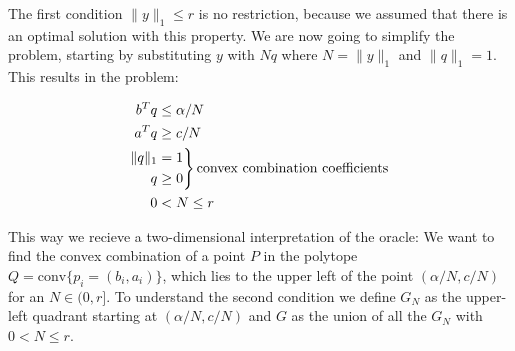 \documentclass[11pt,a4paper]{scrartcl}
\begin{document}
The first condition $\|y\|_1\leq r$ is no restriction, because we assumed that there is an optimal solution with this property. We are now going to simplify the problem, starting by substituting $y$ with $Nq$ where $N=\|y\|_1$ and $\|q\|_1=1$. This results in the problem:

\begin{equation*}
 \begin{split}
  b^T q&\leq \alpha/N\\
  a^T q&\geq c/N\\
  \begin{aligned}
   \|q\|_1\\
   q
  \end{aligned}
  &
  \begin{rcases*}
   =1\\
   \geq 0
  \end{rcases*} \text{convex combination coefficients}  \\
  0&<N\leq r
 \end{split}
\end{equation*}

This way we recieve a two-dimensional interpretation of the oracle: We want to find the convex combination of a point $P$ in the polytope $Q=\mathrm{conv}\{p_i=(b_i,a_i)\}$, which lies to the upper left of the point $(\alpha/N, c/N)$ for an $N\in (0,r]$. To understand the second condition we define $G_N$ as the upper-left quadrant starting at $(\alpha/N, c/N)$ and $G$ as the union of all the $G_N$ with $0<N\leq r$.
\end{document}
